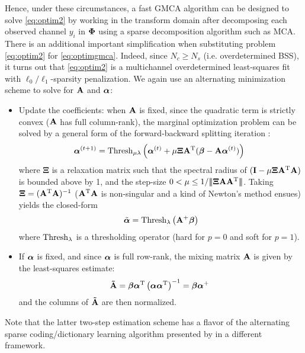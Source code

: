 Hence, under these circumstances, a fast GMCA algorithm can be designed to solve \eqref{eq:optim2} by working in the transform domain after decomposing each 
observed channel $y_i$ in ${{\bf\Phi}}$ using a sparse decomposition algorithm such as MCA. There is an additional important simplification when substituting problem 
\eqref{eq:optim2} for \eqref{eq:optimgmca}. Indeed, since $N_c \geq N_s$ (i.e. overdetermined BSS), it turns out that \eqref{eq:optim2} is a multichannel overdetermined 
least-squares fit with $\ell_0/\ell_1$-sparsity penalization. We again use an alternating minimization scheme to solve for ${\mathbf{A}}$ and ${\boldsymbol \alpha}$:
\begin{itemize}
\item Update the coefficients: when ${\mathbf{A}}$ is fixed, since the quadratic term is strictly convex (${\mathbf{A}}$ has full column-rank), the marginal optimization problem 
can be solved by a general form of the forward-backward splitting iteration \citep{ChenRockafellar97}:
\begin{equation}
{\boldsymbol \alpha}^{(t+1)} = \operatorname{\mathrm{Thresh}}_{\mu\lambda} \left({{\boldsymbol \alpha}^{(t)} + \mu{\boldsymbol \Xi} {\mathbf{A}}^{\mathrm{T}}({\boldsymbol \beta} - {{\mathbf{A}}}{\boldsymbol \alpha}^{(t)})}\right) ~
\end{equation}
where ${\boldsymbol \Xi}$ is a relaxation matrix such that the spectral radius of $({\bf I} - \mu{\boldsymbol \Xi}{\mathbf{A}}^{\mathrm{T}}{\mathbf{A}})$ is bounded above by 1, 
and the step-size $0 < \mu \leq 1/|\!|\!|{\boldsymbol \Xi}{\mathbf{A}}{\mathbf{A}}^{\mathrm{T}}|\!|\!|$. Taking ${\boldsymbol \Xi} = ({\mathbf{A}}^{\mathrm{T}}{\mathbf{A}})^{-1}$ (${\mathbf{A}}^{\mathrm{T}}{\mathbf{A}}$ is non-singular 
and a kind of Newton's method ensues) yields the closed-form
\begin{equation}
\tilde{{\boldsymbol \alpha}}  =  \operatorname{\mathrm{Thresh}}_{\lambda}\left({{\mathbf{A}}^{+}{\boldsymbol \beta}}\right)
\end{equation}
where $\operatorname{\mathrm{Thresh}}_{\lambda}$ is a thresholding operator (hard for $p=0$ and soft for $p=1$).
\item If ${\boldsymbol \alpha}$ is fixed, and since ${\boldsymbol \alpha}$ is full row-rank, the mixing matrix ${\mathbf{A}}$ is given by the least-squares estimate: 
\begin{equation}
{\bf \tilde{A}} = {\boldsymbol \beta}{\boldsymbol \alpha}^{\mathrm{T}}\left({{\boldsymbol \alpha}{\boldsymbol \alpha}^{\mathrm{T}}}\right)^{-1} = {\boldsymbol \beta}{\boldsymbol \alpha}^+ ~
\end{equation}
and the columns of ${\bf \tilde{A}}$ are then normalized.
\end{itemize}
Note that the latter two-step estimation scheme has a flavor of the alternating sparse coding/dictionary learning algorithm presented by \citep{ksvd:elad,fadili:peyrespie07} in a different framework.

